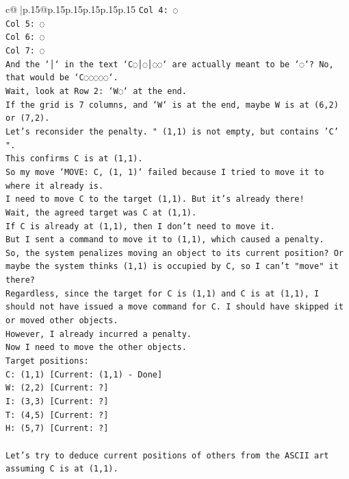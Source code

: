 \documentclass{article}
\begin{document}
{\begin{supertabular}{c@{$\;$}|p{.15\linewidth}@{}p{.15\linewidth}p{.15\linewidth}p{.15\linewidth}p{.15\linewidth}p{.15\linewidth}}
{{{\texttt{Col 4: ◌} \\
\texttt{Col 5: ◌} \\
\texttt{Col 6: ◌} \\
\texttt{Col 7: ◌} \\
\texttt{And the `│` in the text `C◌│◌│◌◌` are actually meant to be `◌`? No, that would be `C◌◌◌◌◌`.} \\
\texttt{Wait, look at Row 2: `W◌` at the end.} \\
\texttt{If the grid is 7 columns, and `W` is at the end, maybe W is at (6,2) or (7,2).} \\
\texttt{Let's reconsider the penalty. " (1,1) is not empty, but contains 'C' ".} \\
\texttt{This confirms C is at (1,1).} \\
\texttt{So my move `MOVE: C, (1, 1)` failed because I tried to move it to where it already is.} \\
\texttt{I need to move C to the target (1,1). But it's already there!} \\
\texttt{Wait, the agreed target was C at (1,1).} \\
\texttt{If C is already at (1,1), then I don't need to move it.} \\
\texttt{But I sent a command to move it to (1,1), which caused a penalty.} \\
\texttt{So, the system penalizes moving an object to its current position? Or maybe the system thinks (1,1) is occupied by C, so I can't "move" it there?} \\
\texttt{Regardless, since the target for C is (1,1) and C is at (1,1), I should not have issued a move command for C. I should have skipped it or moved other objects.} \\
\texttt{However, I already incurred a penalty.} \\
\texttt{Now I need to move the other objects.} \\
\texttt{Target positions:} \\
\texttt{C: (1,1) {[}Current: (1,1) {-} Done{]}} \\
\texttt{W: (2,2) {[}Current: ?{]}} \\
\texttt{I: (3,3) {[}Current: ?{]}} \\
\texttt{T: (4,5) {[}Current: ?{]}} \\
\texttt{H: (5,7) {[}Current: ?{]}} \\
\\ 
\texttt{Let's try to deduce current positions of others from the ASCII art assuming C is at (1,1).} \\
}}}
\end{supertabular}}
\end{document}
